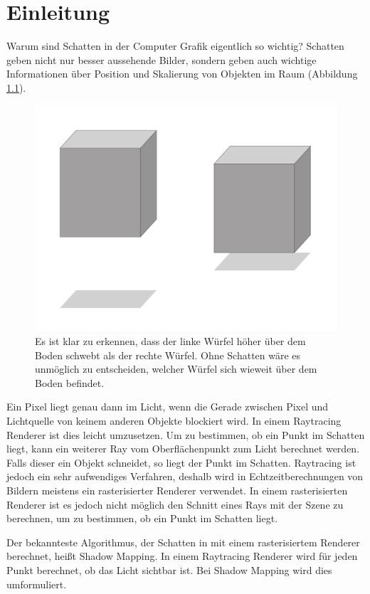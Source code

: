

\chapter{Einleitung}
\label{ch:Introduction}
Warum sind Schatten in der Computer Grafik eigentlich so wichtig?
Schatten geben nicht nur besser aussehende Bilder, sondern geben auch wichtige Informationen über Position und Skalierung von Objekten im Raum
(Abbildung \ref{fig:why-shadows}).

\begin{figure}[H]
	\begin{center}
		\includegraphics[width=.3\textwidth]{res/img/why-shadows.jpg}
    \caption{Es ist klar zu erkennen, dass der linke Würfel höher über dem Boden schwebt als der rechte Würfel. 
    Ohne Schatten wäre es unmöglich zu entscheiden, welcher Würfel sich wieweit über dem Boden befindet.}
	  \label{fig:why-shadows}
	\end{center}
\end{figure}
Ein Pixel liegt genau dann im Licht, wenn die Gerade zwischen Pixel 
und Lichtquelle von keinem anderen Objekte blockiert wird.
In einem Raytracing Renderer ist dies leicht umzusetzen. 
Um zu bestimmen, ob ein Punkt im Schatten liegt, kann ein weiterer Ray vom Oberflächenpunkt zum Licht berechnet werden.
Falls dieser ein Objekt schneidet, so liegt der Punkt im Schatten.
Raytracing ist jedoch ein sehr aufwendiges Verfahren, deshalb wird in Echtzeitberechnungen von Bildern meistens
ein rasterisierter Renderer verwendet.
In einem rasterisierten Renderer ist es jedoch nicht möglich den Schnitt eines Rays mit der Szene
zu berechnen, um zu bestimmen, ob ein Punkt im Schatten liegt.
\par
Der bekannteste Algorithmus, der Schatten in mit einem rasterisiertem Renderer 
berechnet, heißt Shadow Mapping.
In einem Raytracing Renderer wird für jeden Punkt berechnet, ob das Licht sichtbar ist.
Bei Shadow Mapping wird dies umformuliert. 

